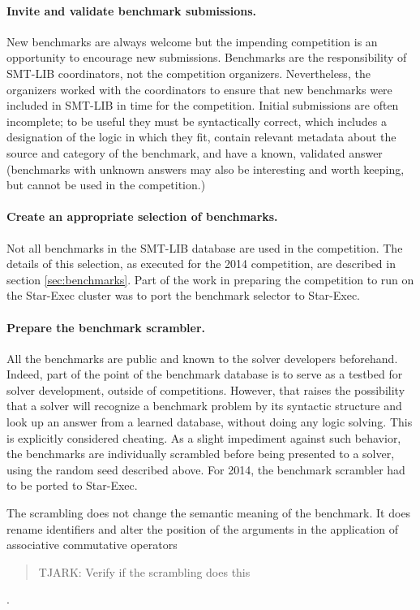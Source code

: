 \documentclass[twosize,11pt]{article}
\newcommand{\comment}[2]{\begin{quote}\sc #1\marginpar{\textcolor{red}{$\ast^{\mbox{#2}}$}}\end{quote}}
\newcommand{\davidc}[1]{\comment{#1}{DC}}
\begin{document}
\paragraph{Invite and validate benchmark submissions.} New benchmarks are always welcome but the impending competition is an opportunity to encourage new submissions. Benchmarks are the responsibility of SMT-LIB coordinators, not the competition organizers. Nevertheless, the organizers worked with the coordinators to ensure that new benchmarks were included in SMT-LIB in time for the competition. Initial submissions are often incomplete; to be useful they must be syntactically correct, which includes a designation of the logic in which they fit, contain relevant metadata about the source and category of the benchmark, and have a known, validated answer (benchmarks with unknown answers may also be interesting and worth keeping, but cannot be used in the competition.)

\paragraph{Create an appropriate selection of benchmarks.} Not all benchmarks in the SMT-LIB database are used in the competition. The details of this selection, as executed for the 2014 competition, are described in section \ref{sec:benchmarks}. Part of the work in preparing the competition to run on the Star-Exec cluster was to port the benchmark selector to Star-Exec.

\paragraph{Prepare the benchmark scrambler.} All the benchmarks are public and known to the solver developers beforehand. Indeed, part of the point of the benchmark database is to serve as a testbed for solver development, outside of competitions. However, that raises the possibility that a solver will recognize a benchmark problem by its syntactic structure and look up an answer from a learned database, without doing any logic solving. This is explicitly considered cheating. As a slight impediment against such behavior, the benchmarks are individually scrambled before being presented to a solver, using the random seed described above. For 2014, the benchmark scrambler had to be ported to Star-Exec.

The scrambling does not change the semantic meaning of the benchmark. It does rename identifiers and alter the position of the arguments in the application of associative commutative operators\davidc{TJARK: Verify if the scrambling does this}.
\end{document}
